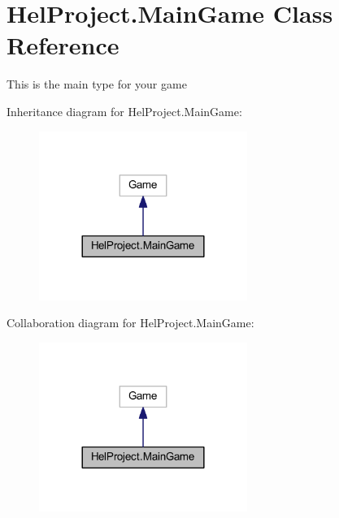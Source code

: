 \hypertarget{class_hel_project_1_1_main_game}{}\section{Hel\+Project.\+Main\+Game Class Reference}
\label{class_hel_project_1_1_main_game}


This is the main type for your game  




Inheritance diagram for Hel\+Project.\+Main\+Game\+:\nopagebreak
\begin{figure}[H]
\begin{center}
\leavevmode
\includegraphics[width=192pt]{class_hel_project_1_1_main_game__inherit__graph}
\end{center}
\end{figure}


Collaboration diagram for Hel\+Project.\+Main\+Game\+:\nopagebreak
\begin{figure}[H]
\begin{center}
\leavevmode
\includegraphics[width=192pt]{class_hel_project_1_1_main_game__coll__graph}
\end{center}
\end{figure}
